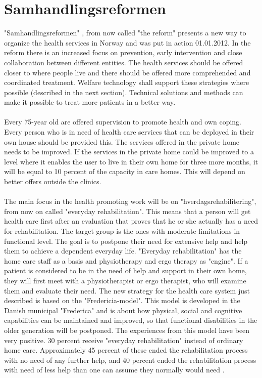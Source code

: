 \section{Samhandlingsreformen}
"Samhandlingsreformen" \cite{budsjett}\cite{regjering}, from now called "the reform" presents a new way to organize the health services in Norway and was put in action 01.01.2012. In the reform there is an increased focus on prevention, early intervention and close collaboration between different entities. The health services should be offered closer to where people live and there should be offered more comprehended and coordinated treatment. Welfare technology shall support these strategies where possible (described in the next section). Technical solutions and methods can make it possible to treat more patients in a better way. \\ \\
Every 75-year old are offered supervision to promote health and own coping. Every person who is in need of health care services that can be deployed in their own house should be provided this. The services offered in the private home needs to be improved. If the services in the private home could be improved to a level where it enables the user to live in their own home for three more months, it will be equal to 10 percent of the capacity in care homes. This will depend on better offers outside the clinics.\\ \\ The main focus in the health promoting work will be on "hverdagsrehabilitering", from now on called  "everyday rehabilitation". This means that a person will get health care first after an evaluation that proves that he or she actually has a need for rehabilitation. The target group is the ones with moderate limitations in functional level. The goal is to postpone their need for extensive help and help them to achieve a dependent everyday life.  "Everyday rehabilitation" has the home care staff as a basis and physiotherapy and ergo therapy as "engine". If a patient is considered to be in the need of help and support in their own home, they will first meet with a physiotherapist or ergo therapist, who will examine them and evaluate their need. The new strategy for the health care system just described is based on the "Fredericia-model". This model is developed in the Danish municipal "Frederica" and is about how physical, social and cognitive capabilities can be maintained and improved, so that functional disabilities in the older generation will be postponed. The experiences from this model have been very positive. 30 percent receive "everyday rehabilitation" instead of ordinary home care. Approximately 45 percent of these ended the rehabilitation process with no need of any further help, and 40 percent ended the rehabilitation process with need of less help than one can assume they normally would need \cite{budsjett}\cite{regjering}.

